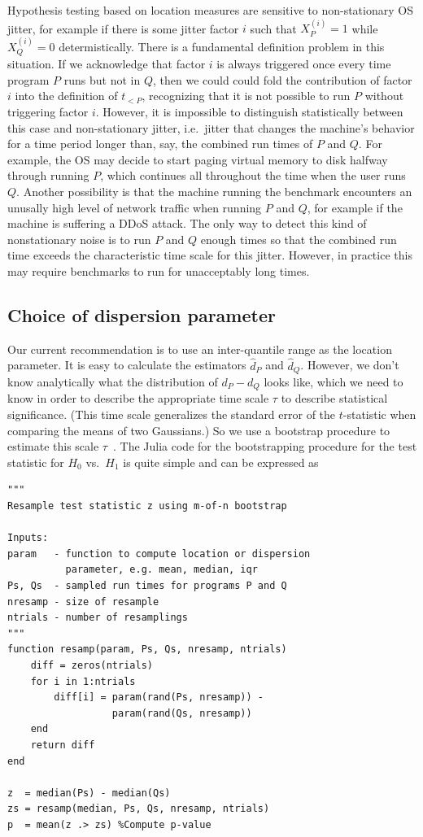 \documentclass[conference]{IEEEtran}
\begin{document}
Hypothesis testing based on location measures are sensitive to non-stationary OS jitter, for example if there is some jitter factor $i$ such that $X^{(i)}_P = 1$ while $X^{(i)}_Q = 0$ determistically. There is a fundamental definition problem in this situation. If we acknowledge that factor $i$ is always triggered once every time program $P$ runs but not in $Q$, then we could could fold the contribution of factor $i$ into the definition of $t_{<P}$, recognizing that it is not possible to run $P$ without triggering factor $i$. However, it is impossible to distinguish statistically between this case and non-stationary jitter, i.e.\ jitter that changes the machine's behavior for a time period longer than, say, the combined run times of $P$ and $Q$. For example, the OS may decide to start paging virtual memory to disk halfway through running $P$, which continues all throughout the time when the user runs $Q$. Another possibility is that the machine running the benchmark encounters an unusally high level of network traffic when running $P$ and $Q$, for example if the machine is suffering a DDoS attack. The only way to detect this kind of nonstationary noise is to run $P$ and $Q$ enough times so that the combined run time exceeds the characteristic time scale for this jitter. However, in practice this may require benchmarks to run for unacceptably long times.


\subsection{Choice of dispersion parameter}

Our current recommendation is to use an inter-quantile range as the location parameter. It is easy to calculate the estimators $\hat d_P$ and $\hat d_Q$. However, we don't know analytically what the distribution of $d_P - d_Q$ looks like, which we need to know in order to describe the appropriate time scale $\tau$ to describe statistical significance. (This time scale generalizes the standard error of the $t$-statistic when comparing the means of two Gaussians.) So we use a bootstrap procedure to estimate this scale $\tau$~\cite{Chernick2008}. The Julia code for the bootstrapping procedure for the test statistic for $H_0$ vs.\ $H_1$ is quite simple and can be expressed as

\begin{lstlisting}
"""
Resample test statistic z using m-of-n bootstrap

Inputs:
param   - function to compute location or dispersion
          parameter, e.g. mean, median, iqr
Ps, Qs  - sampled run times for programs P and Q
nresamp - size of resample
ntrials - number of resamplings
"""
function resamp(param, Ps, Qs, nresamp, ntrials)
    diff = zeros(ntrials)
    for i in 1:ntrials
        diff[i] = param(rand(Ps, nresamp)) -
                  param(rand(Qs, nresamp))
    end
    return diff
end

z  = median(Ps) - median(Qs)
zs = resamp(median, Ps, Qs, nresamp, ntrials)
p  = mean(z .> zs) %Compute p-value
\end{lstlisting}
\end{document}
